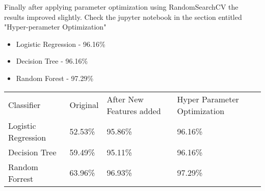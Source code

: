 Finally after applying parameter optimization using RandomSearchCV the results improved slightly. Check the jupyter notebook in the section entitled "Hyper-perameter Optimization"

\begin{itemize}
  \item Logistic Regression - 96.16\%
  \item Decision Tree - 96.16\%
  \item Random Forest - 97.29\%
\end{itemize}

\begin{table}[H]
\centering
\begin{tabular}{llll}
\rowcolor[HTML]{9B9B9B} 
Classifier                                  & Original & After New Features added & Hyper Parameter Optimization \\
\cellcolor[HTML]{C0C0C0}Logistic Regression & 52.53\%  & 95.86\%                  & 96.16\%                      \\
\cellcolor[HTML]{C0C0C0}Decision Tree       & 59.49\%  & 95.11\%                  & 96.16\%                      \\
\cellcolor[HTML]{C0C0C0}Random Forrest      & 63.96\%  & 96.93\%                  & 97.29\%                     
\end{tabular}
\end{table}